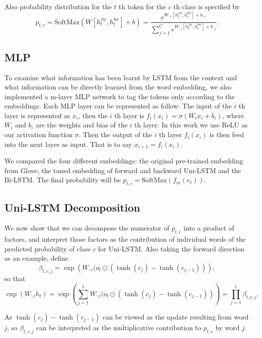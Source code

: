 \documentclass{article}
\begin{document}
Also probability distribution for the $t$ th token for the $c$ th class is specified by 
\begin{equation}
p_{t, c} = \text{SoftMax}(W [h_t^{fw}, h_t^{bw}] + b) = \frac{e^{W_{:c} [h_t^{fw}, h_t^{bw}] + b_{:c}}}{\sum_{j = 1} ^ C e^{W_{:j} [h_t^{fw}, h_t^{bw}] + b_{:j}}}.
\end{equation}

\subsection{MLP}

To examine what information has been learnt by LSTM from the context and what information can be directly learned from the word embedding, we also implemented a m-layer MLP network to tag the tokens only according to the embeddings. Each MLP layer can be represented as follow:
The input of the $i$ th layer is represented as $x_i$, then the $i$ th layer is $f_i(x_i) = \sigma(W_i x_i + b_i)$, where $W_i$ and $b_i$ are the weights and bias of the $i$ th layer. In this work we use ReLU as our activation function $\sigma$. Then the output of the $i$ th layer $f_i(x_i)$ is then feed into the next layer as input. That is to say $x_{i+1} = f_i(x_i)$. 

We compared the four different embeddings: the original pre-trained embedding from Glove, the tuned embedding of forward and backward Uni-LSTM and the Bi-LSTM. The final probability will be $p_{t, c} = \text{SoftMax}(f_m(e_t))$.%

\subsection{Uni-LSTM Decomposition}
\label{uni-lstm-decom}

We now show that we can decompose the numerator of $p_{t, c}$ into a product of factors, and interpret those factors as the contribution of individual words of the predicted probability of class $c$ for Uni-LSTM. Also taking the forward direction as an example, define 
\begin{equation}\label{eq:uni-beta} 
\beta_{t, c, j} = \exp\left(W_{:c} (o_t \odot (\tanh(c_j)- \tanh(c_{j-1}))\right),
\end{equation}
so that 
\[\exp( W_{:c} h_t) = \exp\left(\sum_{j=1}^t W_{:c} (o_t \odot (\tanh(c_j) - \tanh(c_{j-1}))\right) = \prod_{j=1}^t \beta_{t, c, j}.\]

As $\tanh(c_j) - \tanh(c_{j-1})$ can be viewed as the update resulting from word $j$, so $\beta_{t, c, j}$ can be interpreted as the multiplicative contribution to $p_{t, c}$ by word $j$. 
\end{document}
